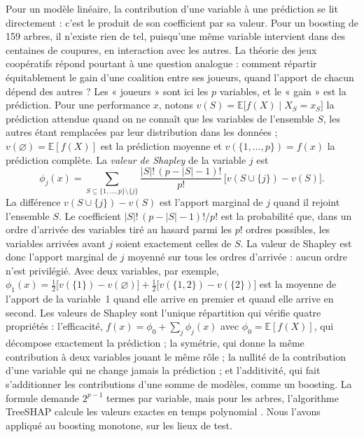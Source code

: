 \documentclass[11pt,a4paper]{article}
\newcommand{\E}{\mathbb{E}}
\begin{document}
Pour un modèle linéaire, la contribution d'une variable à une prédiction se lit directement : c'est le produit de son
coefficient par sa valeur. Pour un boosting de 159 arbres, il n'existe rien de tel, puisqu'une même variable intervient
dans des centaines de coupures, en interaction avec les autres. La théorie des jeux coopératifs répond pourtant à une
question analogue : comment répartir équitablement le gain d'une coalition entre ses joueurs, quand l'apport de chacun
dépend des autres \citep{shapley1953} ? Les « joueurs » sont ici les $p$ variables, et le « gain » est la prédiction.
Pour une performance $x$, notons $v(S) = \E\big[f(X) \mid X_S = x_S\big]$ la prédiction attendue quand on ne connaît
que les variables de l'ensemble $S$, les autres étant remplacées par leur distribution dans les données ;
$v(\varnothing) = \E[f(X)]$ est la prédiction moyenne et $v(\{1, \dots, p\}) = f(x)$ la prédiction complète. La
\emph{valeur de Shapley} de la variable $j$ est
\begin{equation}\label{eq:shapley}
\phi_j(x) = \sum_{S \subseteq \{1, \dots, p\} \setminus \{j\}} \frac{|S|!\,(p - |S| - 1)!}{p!}\,
\big[v(S \cup \{j\}) - v(S)\big].
\end{equation}
La différence $v(S \cup \{j\}) - v(S)$ est l'apport marginal de $j$ quand il rejoint l'ensemble $S$. Le coefficient
$|S|!\,(p - |S| - 1)!/p!$ est la probabilité que, dans un ordre d'arrivée des variables tiré au hasard parmi les $p!$
ordres possibles, les variables arrivées avant $j$ soient exactement celles de $S$. La valeur de Shapley est donc
l'apport marginal de $j$ moyenné sur tous les ordres d'arrivée : aucun ordre n'est privilégié. Avec deux variables,
par exemple, $\phi_1(x) = \frac12\big[v(\{1\}) - v(\varnothing)\big] + \frac12\big[v(\{1, 2\}) - v(\{2\})\big]$ est la
moyenne de l'apport de la variable~1 quand elle arrive en premier et quand elle arrive en second. Les valeurs de
Shapley sont l'unique répartition qui vérifie quatre propriétés : l'efficacité,
$f(x) = \phi_0 + \sum_{j} \phi_j(x)$ avec $\phi_0 = \E[f(X)]$, qui décompose exactement la prédiction ; la symétrie,
qui donne la même contribution à deux variables jouant le même rôle ; la nullité de la contribution d'une variable
qui ne change jamais la prédiction ; et l'additivité, qui fait s'additionner les contributions d'une somme de modèles,
comme un boosting. La formule demande $2^{p-1}$ termes par variable, mais pour les arbres, l'algorithme TreeSHAP
calcule les valeurs exactes en temps polynomial \citep{lundberg2017, lundberg2020}. Nous l'avons appliqué au boosting
monotone, sur les lieux de test.
\end{document}
